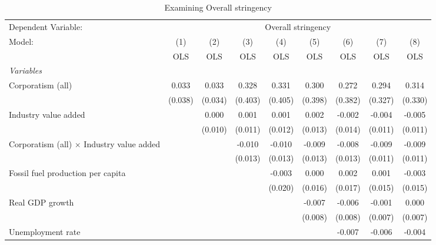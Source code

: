 
\begin{table}[htbp]
   \caption{Examining Overall stringency}
   \centering
   \begin{tabular}{lcccccccc}
      \toprule
      Dependent Variable: & \multicolumn{8}{c}{Overall stringency}\\
      Model:                                           & (1)     & (2)     & (3)     & (4)     & (5)     & (6)     & (7)     & (8)\\  
                                                       &  OLS    & OLS     & OLS     & OLS     & OLS     & OLS     & OLS     & OLS\\  
      \midrule
      \emph{Variables}\\
      Corporatism (all)                                & 0.033   & 0.033   & 0.328   & 0.331   & 0.300   & 0.272   & 0.294   & 0.314\\   
                                                       & (0.038) & (0.034) & (0.403) & (0.405) & (0.398) & (0.382) & (0.327) & (0.330)\\   
      Industry value added                             &         & 0.000   & 0.001   & 0.001   & 0.002   & -0.002  & -0.004  & -0.005\\   
                                                       &         & (0.010) & (0.011) & (0.012) & (0.013) & (0.014) & (0.011) & (0.011)\\   
      Corporatism (all) $\times$ Industry value added  &         &         & -0.010  & -0.010  & -0.009  & -0.008  & -0.009  & -0.009\\   
                                                       &         &         & (0.013) & (0.013) & (0.013) & (0.013) & (0.011) & (0.011)\\   
      Fossil fuel production per capita                &         &         &         & -0.003  & 0.000   & 0.002   & 0.001   & -0.003\\   
                                                       &         &         &         & (0.020) & (0.016) & (0.017) & (0.015) & (0.015)\\   
      Real GDP growth                                  &         &         &         &         & -0.007  & -0.006  & -0.001  & 0.000\\   
                                                       &         &         &         &         & (0.008) & (0.008) & (0.007) & (0.007)\\   
      Unemployment rate                                &         &         &         &         &         & -0.007  & -0.006  & -0.004\\   

\end{tabular}
\end{table}
